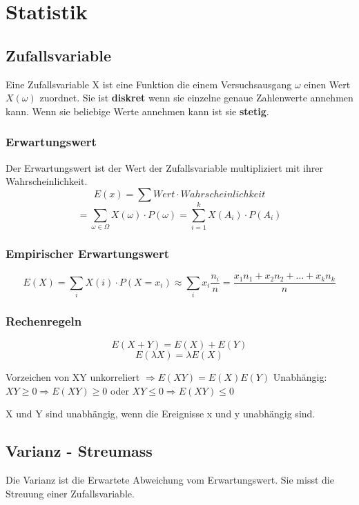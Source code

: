 \documentclass[margin=normal]{tex/hsrzf}
\begin{document}
\section{Statistik}
\begin{multicols}{2}

    \subsection{Zufallsvariable}

    Eine Zufallsvariable X ist eine Funktion die einem
    Versuchsausgang $\omega$ einen Wert $X(\omega)$ zuordnet.
    Sie ist \textbf{diskret} wenn sie einzelne genaue Zahlenwerte annehmen kann.
    Wenn sie beliebige Werte annehmen kann ist sie \textbf{stetig}.

    \subsubsection*{Erwartungswert}
    Der Erwartungswert ist der Wert der Zufallsvariable multipliziert mit ihrer Wahrscheinlichkeit.
    $$E(x) = \sum Wert \cdot Wahrscheinlichkeit$$
    $$ =\sum _{\omega \in \Omega} X(\omega) \cdot P({\omega}) = \sum _{i=1} ^{k} X(A_i) \cdot P(A_i)$$
    \subsubsection*{Empirischer Erwartungswert}

    $$ E(X) = \sum _i X(i) \cdot P(X=x_i) \approx \sum _i x_i \frac{n_i}{n} = \frac{x_1n_1 + x_2n_2 + \dots + x_kn_k}{n}$$

    \subsubsection*{Rechenregeln}
    $$E(X+Y) = E(X) + E(Y)$$
    $$E(\lambda X) = \lambda E(X)$$

    Vorzeichen von XY unkorreliert $\Rightarrow E(XY) = E(X)E(Y)$
    Unabhängig: $XY \geq 0 \Rightarrow E(XY) \geq 0$ oder $XY\leq 0 \Rightarrow E(XY) \leq 0$

    X und Y sind unabhängig, wenn die Ereignisse x und y unabhängig sind.

    \subsection{Varianz - Streumass}
    Die Varianz ist die Erwartete Abweichung vom Erwartungswert.
    Sie misst die Streuung einer Zufallsvariable.


\end{multicols}
\end{document}
